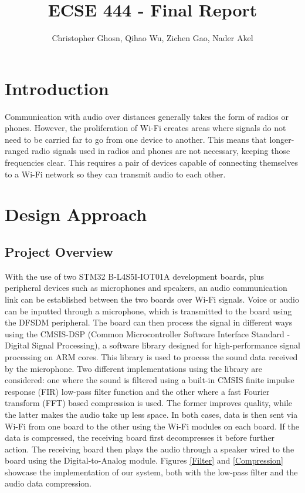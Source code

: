 \documentclass[journal]{IEEEtran}
\begin{document}
\title{ECSE 444 - Final Report}

\author{Christopher Ghosn, Qihao Wu, Zichen Gao, Nader Akel}

\maketitle

\section{Introduction}
Communication with audio over distances generally takes the form of radios or phones. However, the proliferation of Wi-Fi creates areas where signals do not need to be carried far to go from one device to another. This means that longer-ranged radio signals used in radios and phones are not necessary, keeping those frequencies clear. This requires a pair of devices capable of connecting themselves to a Wi-Fi network so they can transmit audio to each other.

\section{Design Approach}
\subsection{Project Overview}
With the use of two STM32 B-L4S5I-IOT01A development boards, plus peripheral devices such as microphones and speakers, an audio communication link can be established between the two boards over Wi-Fi signals. Voice or audio can be inputted through a microphone, which is transmitted to the board using the DFSDM peripheral. The board can then process the signal in different ways using the CMSIS-DSP (Common Microcontroller Software Interface Standard - Digital Signal Processing), a software library designed for high-performance signal processing on ARM cores. This library is used to process the sound data received by the microphone. Two different implementations using the library are considered: one where the sound is filtered using a built-in CMSIS finite impulse response (FIR) low-pass filter function and the other where a fast Fourier transform (FFT) based compression is used. The former improves quality, while the latter makes the audio take up less space. In both cases, data is then sent via Wi-Fi from one board to the other using the Wi-Fi modules on each board. If the data is compressed, the receiving board first decompresses it before further action. The receiving board then plays the audio through a speaker wired to the board using the Digital-to-Analog module. Figures \ref{Filter} and \ref{Compression} showcase the implementation of our system, both with the low-pass filter and the audio data compression.
\end{document}

